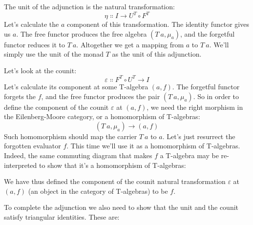 The unit of the adjunction is the natural transformation:
\[\eta \Colon I \to U^T \circ F^T\]
Let's calculate the $a$ component of this transformation. The
identity functor gives us $a$. The free functor produces the free
algebra $(T\ a, \mu_a)$, and the forgetful functor reduces it to
$T\ a$. Altogether we get a mapping from $a$ to
$T\ a$. We'll simply use the unit of the monad $T$ as the
unit of this adjunction.

Let's look at the counit:
\[\varepsilon \Colon F^T \circ U^T \to I\]
Let's calculate its component at some T-algebra $(a, f)$. The
forgetful functor forgets the $f$, and the free functor produces
the pair $(T\ a, \mu_a)$. So in order to define the component of
the counit $\varepsilon$ at $(a, f)$, we need the right morphism in
the Eilenberg-Moore category, or a homomorphism of T-algebras:
\[(T\ a, \mu_a) \to (a, f)\]
Such homomorphism should map the carrier $T\ a$ to $a$.
Let's just resurrect the forgotten evaluator $f$. This time we'll
use it as a homomorphism of T-algebras. Indeed, the same commuting
diagram that makes $f$ a T-algebra may be re-interpreted to show
that it's a homomorphism of T-algebras:

\begin{figure}[H]
\centering
{}
\end{figure}

\noindent
We have thus defined the component of the counit natural transformation
$\varepsilon$ at $(a, f)$ (an object in the category of T-algebras)
to be $f$.

To complete the adjunction we also need to show that the unit and the
counit satisfy triangular identities. These are:

\begin{figure}[H]
  \centering
  \begin{subfigure}
    \centering
  \end{subfigure}%
  \hspace{1cm}
  \begin{subfigure}
    \centering
  \end{subfigure}
\end{figure}

